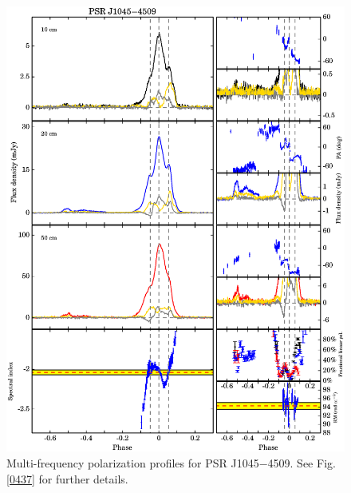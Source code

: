 \documentclass[useAMS,usenatbib]{mn2e}
\begin{document}
\begin{appendices}
\begin{figure}
\begin{center}
\includegraphics[width=6 in]{1045.ps}
\caption{Multi-frequency polarization profiles for PSR J1045$-$4509. 
See Fig. \ref{0437} for further details.}
\label{1045}
\end{center}
\end{figure}


\end{appendices}
\end{document}
